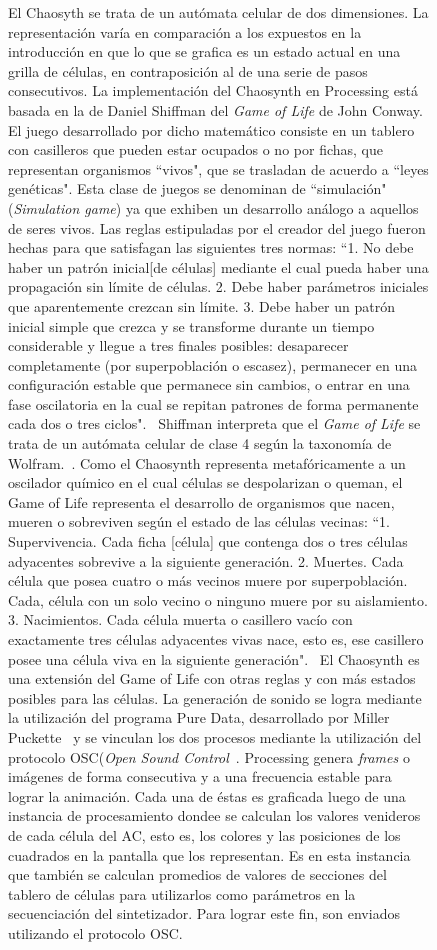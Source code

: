 \documentclass[16pt,spanish]{article}
\begin{document}
\begin{figure}[h!]
	El Chaosyth se trata de un autómata celular de dos dimensiones. La representación varía en comparación a los expuestos en la introducción en que lo que se grafica es un estado actual en una grilla de células, en contraposición al de una serie de pasos consecutivos. La implementación del Chaosynth en Processing está basada en la de Daniel Shiffman del \textit{Game of Life} de John Conway. El juego desarrollado por dicho matemático consiste en un tablero con casilleros que pueden estar ocupados o no por fichas, que representan organismos ``vivos", que se trasladan de acuerdo a ``leyes genéticas". Esta clase de juegos se denominan de  ``simulación"(\textit{Simulation game}) ya que exhiben un desarrollo análogo a aquellos de seres vivos. Las reglas estipuladas por el creador del juego fueron hechas para que satisfagan las siguientes tres normas: ``1. No debe haber un patrón inicial[de células] mediante el cual pueda haber una propagación sin límite de células. 2. Debe haber parámetros iniciales que aparentemente crezcan sin límite. 3. Debe haber un patrón inicial simple que crezca y se transforme durante un tiempo considerable y llegue a tres finales posibles: desaparecer completamente (por superpoblación o escasez), permanecer en una configuración estable que permanece sin cambios, o entrar en una fase oscilatoria en la cual se repitan patrones de forma permanente cada dos o tres ciclos".~\cite{gardner1971mathematical} Shiffman interpreta que el \textit{Game of Life} se trata de un autómata celular de clase 4 según la taxonomía de Wolfram.~\cite{shiffman2012nature}. Como el Chaosynth representa metafóricamente a un oscilador químico en el cual células se despolarizan o queman, el Game of Life representa el desarrollo de organismos que nacen, mueren o sobreviven según el estado de las células vecinas: ``1. Supervivencia. Cada ficha [célula] que contenga dos o tres células adyacentes sobrevive a la siguiente generación. 2. Muertes. Cada célula que posea cuatro o más vecinos muere por superpoblación. Cada, célula con un solo vecino o ninguno muere por su aislamiento. 3. Nacimientos. Cada célula muerta o casillero vacío con exactamente tres células adyacentes vivas nace, esto es, ese casillero posee una célula viva en la siguiente generación".~\cite{gardner1971mathematical} El Chaosynth es una extensión del Game of Life con otras reglas y con más estados posibles para las células.
	La generación de sonido se logra mediante la utilización del programa Pure Data, desarrollado por Miller Puckette~\cite{miller2007theory} y se vinculan los dos procesos mediante la utilización del protocolo OSC(\textit{Open Sound Control}~\cite{wright2005open}. Processing genera \textit{frames} o imágenes de forma consecutiva y a una frecuencia estable para lograr la animación. Cada una de éstas es graficada luego de una instancia de procesamiento dondee se calculan los valores venideros de cada célula del AC, esto es, los colores y las posiciones de los cuadrados en la pantalla que los representan. Es en esta instancia que también se calculan promedios de valores de secciones del tablero de células para utilizarlos como parámetros en la secuenciación del sintetizador. Para lograr este fin, son enviados utilizando el protocolo OSC.


\end{figure}
\end{document}
